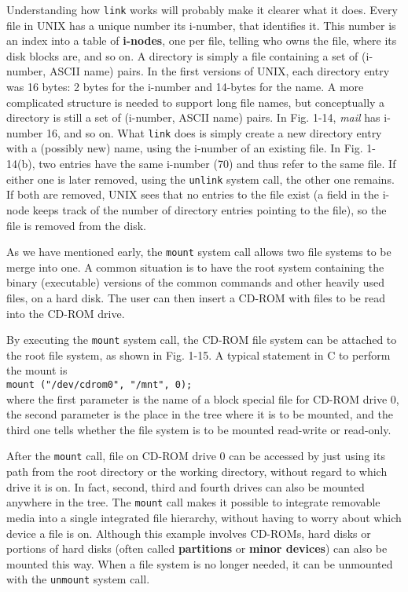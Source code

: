 \documentclass{book}
\newcommand {\kw}  [1] {\textbf{#1}}
\newcommand {\sys} [1] {\textsl{#1}}
\newcommand {\cmd} [1] {\texttt{#1}}
\begin{document}
Understanding how \cmd{link} works will probably make it clearer what it does.
Every file in UNIX has a unique number its i-number, that identifies it.
This number is an index into a table of \kw{i-nodes}, one per file, telling who owns the file, 
where its disk blocks are, and so on.
A directory is simply a file containing a set of (i-number, ASCII name) pairs.
In the first versions of UNIX, each directory entry was 16 bytes: 2 bytes for the i-number and 14-bytes for the name.
A more complicated structure is needed to support long file names, but conceptually a directory is still a set of (i-number, ASCII name) pairs.
In Fig. 1-14, \sys{mail} has i-number 16, and so on.
What \cmd{link} does is simply create a new directory entry with a (possibly new) name, using the i-number of an existing file.
In Fig. 1-14(b), two entries have the same i-number (70) and thus refer to the same file.
If either one is later removed, using the \cmd{unlink} system call, the other one remains.
If both are removed, UNIX sees that no entries to the file exist 
(a field in the i-node keeps track of the number of directory entries pointing to the file), so the file is removed from the disk.

As we have mentioned early, the \cmd{mount} system call allows two file systems to be merge into one.
A common situation is to have the root system containing the binary (executable) versions of the common commands 
and other heavily used files, on a hard disk.
The user can then insert a CD-ROM with files to be read into the CD-ROM drive.

By executing the \cmd{mount} system call, the CD-ROM file system can be attached to the root file system, as shown in Fig. 1-15.
A typical statement in C to perform the mount is\\
\cmd{mount ("/dev/cdrom0", "/mnt", 0);}\\
where the first parameter is the name of a block special file for CD-ROM drive 0, 
the second parameter is the place in the tree where it is to be mounted,
and the third one tells whether the file system is to be mounted read-write or read-only.

After the \cmd{mount} call, file on CD-ROM drive 0 can be accessed by just using its path from the root directory or the working directory,
without regard to which drive it is on.
In fact, second, third and fourth drives can also be mounted anywhere in the tree.
The \cmd{mount} call makes it possible to integrate removable media into a single integrated file hierarchy,
without having to worry about which device a file is on.
Although this example involves CD-ROMs, hard disks or portions of hard disks
(often called \kw{partitions} or \kw{minor devices}) can also be mounted this way.
When a file system is no longer needed, it can be unmounted with the \cmd{unmount} system call.
\end{document}
